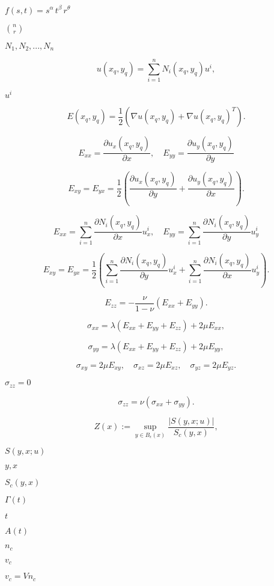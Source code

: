 \documentclass{article}
\begin{document}
$ f(s,t) = s^\alpha\, t^\beta \, r^\theta $
\pagebreak

$ {n\choose r}$
\pagebreak

$ N_1, N_2,..., N_n $
\pagebreak

\[ u(x_q,y_q) = \sum_{i=1}^n N_i(x_q, y_q) u^i, \]
\pagebreak

$ u^i $
\pagebreak

\[ E(x_q, y_q) = \frac{1}{2}( \nabla u(x_q, y_q) + \nabla u(x_q,y_q)^T ). \]
\pagebreak

\[ E_{xx} = \frac{\partial u_x(x_q, y_q)}{\partial x}, \quad E_{yy} = \frac{\partial u_y(x_q, y_q)}{\partial y} \]
\pagebreak

\[ E_{xy} = E_{yx} = \frac{1}{2}( \frac{\partial u_x(x_q, y_q) }{\partial y} + \frac{\partial u_y(x_q, y_q)}{\partial x}). \]
\pagebreak

\[ E_{xx} = \sum_{i=1}^n\frac{\partial N_i(x_q, y_q)}{\partial x} u^i_x, \quad E_{yy} = \sum_{i=1}^n \frac{\partial N_i(x_q, y_q)}{\partial y} u^i_y \]
\pagebreak

\[ E_{xy} = E_{yx} = \frac{1}{2}( \sum_{i=1}^n \frac{\partial N_i(x_q, y_q) }{\partial y} u^i_x + \sum_{i=1}^n \frac{\partial N_i(x_q, y_q) }{\partial x} u^i_y). \]
\pagebreak

\[ E_{zz} = -\frac{\nu}{1 - \nu} (E_{xx} + E_{yy}).\]
\pagebreak

\[ \sigma_{xx} = \lambda (E_{xx} + E_{yy} + E_{zz}) + 2\mu E_{xx},\]
\pagebreak

\[\sigma_{yy} = \lambda (E_{xx} + E_{yy} + E_{zz}) + 2\mu E_{yy},\]
\pagebreak

\[ \sigma_{xy} = 2\mu E_{xy},\quad \sigma_{xz} = 2\mu E_{xz}, \quad \sigma_{yz} = 2\mu E_{yz}.\]
\pagebreak

$ \sigma_{zz} = 0 $
\pagebreak

\[ \sigma_{zz} = \nu (\sigma_{xx} + \sigma_{yy}) .\]
\pagebreak

\[ Z(x) := \sup_{y\in B_\epsilon(x)} \frac{|S(y,x;u)|}{S_c(y,x)}, \]
\pagebreak

$ S(y, x;u) $
\pagebreak

$y,x$
\pagebreak

$S_c(y,x) $
\pagebreak

$ \Gamma(t) $
\pagebreak

$ t $
\pagebreak

$ A(t) $
\pagebreak

$ n_c$
\pagebreak

$ v_c $
\pagebreak

$ v_c = V n_c$
\pagebreak
\end{document}
